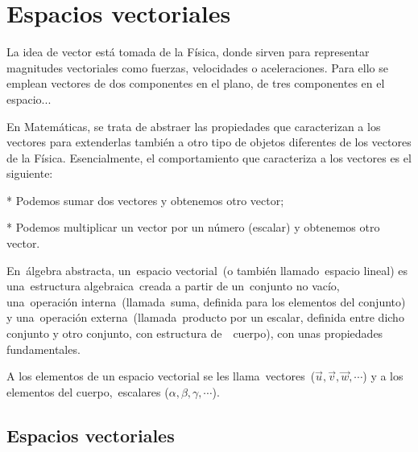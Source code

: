 \chapter{Espacios vectoriales}	\label{e_vec}

\setlength{\parindent}{0cm}
\vspace{5mm}

La idea de vector está tomada de la Física, donde sirven para representar magnitudes vectoriales como fuerzas, velocidades o aceleraciones. Para ello se emplean vectores de dos componentes en el plano, de tres componentes en el espacio... 

En Matemáticas, se trata de abstraer las propiedades que caracterizan a los vectores para extenderlas también a otro tipo de objetos diferentes de los vectores de la Física. Esencialmente, el comportamiento que caracteriza a los vectores es el siguiente: 

\hspace{3mm} * Podemos sumar dos vectores y obtenemos otro vector; 

\hspace{3mm} * Podemos multiplicar un vector por un número (escalar) y obtenemos otro vector. 

En álgebra abstracta, un espacio vectorial (o también llamado espacio lineal) es una estructura algebraica creada a partir de un conjunto no vacío, una operación interna (llamada suma, definida para los elementos del conjunto) y una operación externa (llamada producto por un escalar, definida entre dicho conjunto y otro conjunto, con estructura de  cuerpo), con unas propiedades fundamentales.

A los elementos de un espacio vectorial se les llama vectores ($\vec u, \vec v, \vec w, \cdots  $) y a los elementos del cuerpo, escalares ($\alpha, \beta, \gamma, \cdots$).

\section{Espacios vectoriales}


